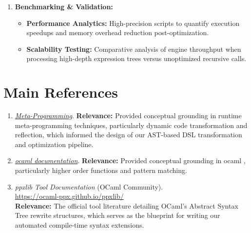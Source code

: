 \documentclass[12pt]{article}
\begin{document}
\begin{enumerate}
\begin{itemize}
        \item \textbf{Compile-Time PPX Logging:}  
        A syntax rewriter implemented using \texttt{ppxlib} that automatically instruments functions with entry/exit logs (annotated via \texttt{[\%\%log let ...]}), demonstrating non-invasive instrumentation.
        
        \item \textbf{Higher-Order Memoization:}  
        A runtime meta-transformation that dynamically augments existing recursive functions with caching logic, showcasing the power of higher-order functions to optimize recursive patterns.
        
        \item \textbf{Meta-Transformation Taxonomy:}  
        A formal classification registry in \texttt{optimizer.ml} that categorizes every transform into Optimizing, Structural, or Instrumentation classes for structural observability.
    \end{itemize}

    \item \textbf{Benchmarking \& Validation:}
    \begin{itemize}
        \item \textbf{Performance Analytics:} High-precision scripts to quantify execution speedups and memory overhead reduction post-optimization.
        \item \textbf{Scalability Testing:} Comparative analysis of engine throughput when processing high-depth expression trees versus unoptimized recursive calls.
    \end{itemize}
\end{enumerate}

\section{Main References}

\begin{enumerate}
    \item \href{https://maestroinc.medium.com/meta-programming-in-python-28d5ace0223c}{\textit{Meta-Programming}}. \textbf{Relevance:} Provided conceptual grounding in runtime meta-programming techniques, particularly dynamic code transformation and reflection, which informed the design of our AST-based DSL transformation and optimization pipeline.
     \item \href{https://ocaml.org/docs}{\textit{ocaml documentation}}. \textbf{Relevance:} Provided conceptual grounding in ocaml , particularly higher order functions and pattern matching.
   
    \item \textit{ppxlib Tool Documentation} (OCaml Community).\\
    \href{https://ocaml-ppx.github.io/ppxlib/}{https://ocaml-ppx.github.io/ppxlib/}\\
    \textbf{Relevance:} The official tool literature detailing OCaml's Abstract Syntax Tree rewrite structures, which serves as the blueprint for writing our automated compile-time syntax extensions.
\end{enumerate}
\end{document}
